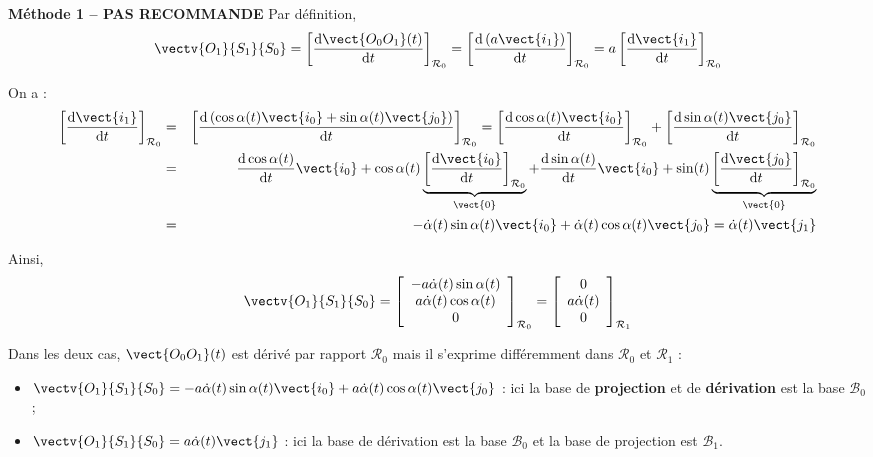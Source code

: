 

\ifprof
\begin{corrige}


\textbf{Méthode 1 -- PAS RECOMMANDE }
Par définition, 
$$
\vectv{O_1}{S_1}{S_0} 
= \left[\dfrac{\text{d}\vect{O_0O_1}(t)}{\text{d}t}\right]_{\mathcal{R}_0}
= \left[\dfrac{\text{d} \left(a \vect{i_1}\right) }{\text{d}t}\right]_{\mathcal{R}_0}
= a \left[\dfrac{\text{d}  \vect{i_1} }{\text{d}t}\right]_{\mathcal{R}_0}
$$

On a :
\begin{eqnarray*}
\left[\dfrac{\text{d}  \vect{i_1} }{\text{d}t}\right]_{\mathcal{R}_0}
&=&\left[\dfrac{\text{d} \left(\cos\alpha(t)\vect{i_0}+\sin\alpha(t)\vect{j_0} \right)}{\text{d}t}\right]_{\mathcal{R}_0}
=\left[\dfrac{\text{d}  \cos\alpha(t)\vect{i_0}}{\text{d}t}\right]_{\mathcal{R}_0}
+\left[\dfrac{\text{d}  \sin\alpha(t)\vect{j_0} }{\text{d}t}\right]_{\mathcal{R}_0}\\
& = & 
\dfrac{\text{d} \cos\alpha(t)}{\text{d}t} \vect{i_0}  
+\cos\alpha(t)\underbrace{\left[\dfrac{\text{d}  \vect{i_0}}{\text{d}t}\right]_{\mathcal{R}_0}}_{\vect{0}}
+\dfrac{\text{d} \sin\alpha(t)}{\text{d}t} \vect{i_0}  
+\sin(t)\underbrace{\left[\dfrac{\text{d}  \vect{j_0}}{\text{d}t}\right]_{\mathcal{R}_0}}_{\vect{0}}\\
& = & -\dot{\alpha}(t)\sin\alpha(t) \vect{i_0}   + \dot{\alpha}(t)\cos\alpha(t) \vect{j_0}  = 
\dot{\alpha}(t)\vect{j_1}
\end{eqnarray*}

Ainsi,
$$
\vectv{O_1}{S_1}{S_0} 
= \left[\begin{array}{c} 
-a\dot{\alpha}(t)\sin\alpha(t) \\
a \dot{\alpha}(t)\cos\alpha(t) \\
0 \end{array}\right]_{\mathcal{R}_0}
=\left[\begin{array}{c} 0 \\ a\dot{\alpha}(t) \\ 0\end{array}\right]_{\mathcal{R}_1}
$$

Dans les deux cas, $\vect{O_0O_1}(t)$ est dérivé par rapport $\mathcal{R}_0$ mais il s'exprime différemment dans $\mathcal{R}_0$ et $\mathcal{R}_1$ :
\begin{itemize}
\item $\vectv{O_1}{S_1}{S_0} = -a\dot{\alpha}(t)\sin\alpha(t) \vect{i_0}   + a\dot{\alpha}(t) \cos\alpha(t) \vect{j_0}$ : ici la base de \textbf{projection} et de \textbf{dérivation} est la base $\mathcal{B}_0$;
\item $\vectv{O_1}{S_1}{S_0} = a\dot{\alpha}(t)\vect{j_1}$ : ici la base de dérivation est la base $\mathcal{B}_0$ et la base de projection est $\mathcal{B}_1$.
\end{itemize}



\end{corrige}
